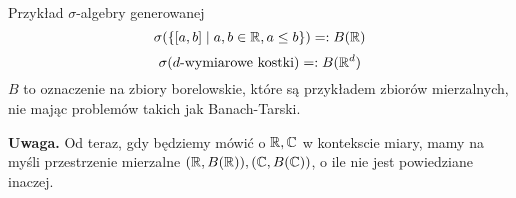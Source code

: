 \begin{example}
	\label{borel-set}
	Przykład \(\sigma\)-algebry generowanej
	\[
		\sigma(\set{[a, b] \mid a, b \in \real, a \leq b}) =: B(\real)
	\]
	\[
		\sigma(d\text{-wymiarowe kostki}) =: B(\mathbb{R}^d)
	\]
	\(B\) to oznaczenie na zbiory borelowskie, które są przykładem zbiorów mierzalnych, nie mając problemów takich jak Banach-Tarski.
	
	\textbf{Uwaga. } Od teraz, gdy będziemy mówić o \(\mathbb{R}, \mathbb{C}\) w kontekscie miary, mamy na myśli przestrzenie mierzalne \((\mathbb{R}, B(\mathbb{R})), (\mathbb{C}, B(\mathbb{C}))\), o ile nie jest powiedziane inaczej.
\end{example}
